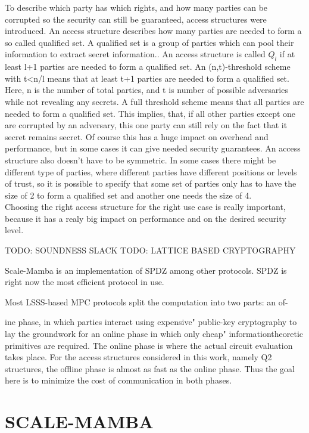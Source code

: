 \documentclass[english,runningheads,a4paper]{llncs}[2018/03/10]
\begin{document}
To describe which party has which rights, and how many parties can be corrupted so the security can still be guaranteed, access structures were introduced.
An access structure describes how many parties are needed to form a so called qualified set. A qualified set is a group of parties which can pool their information to extract secret information..  An access structure is called \(Q_l \) if at least l+1 parties are needed to  form a qualified set. 
An (n,t)-threshold scheme with t<n/l means that at least t+1 parties are needed to form a qualified set. Here, n is the number of total parties, and t is number of possible adversaries while not revealing any secrets.
A full threshold scheme means that all parties are needed to form a qualified set. This implies, that, if all other parties except one are corrupted by an adversary, this one party can still rely on the fact that it secret remains secret. Of course this has a huge impact on overhead and performance, but in some cases it can give needed security guarantees.
An access structure also doesn't have to be symmetric. In some cases there might be different type of parties, where different parties have different positions or levels of trust, so it is possible to specify that some set of parties only has to have the size of 2 to form a qualified set and another one needs the size of 4.\\
Choosing the right access structure for the right use case is really important, because it has a realy big impact on performance and on the desired security level.


TODO: SOUNDNESS SLACK
TODO: LATTICE BASED CRYPTOGRAPHY

Scale-Mamba is an implementation of SPDZ among other protocols. SPDZ is right now the most efficient protocol in use. 

Most LSSS-based MPC protocols split the computation into two parts: an of-

ine phase, in which parties interact using expensive" public-key cryptography
to lay the groundwork for an online phase in which only cheap" informationtheoretic
primitives are required. The online phase is where the actual circuit
evaluation takes place. For the access structures considered in this work, namely
Q2 structures, the offline phase is almost as fast as the online phase. Thus the
goal here is to minimize the cost of communication in both phases.

\section{SCALE-MAMBA}\label{sec:scalemamba}
\end{document}

